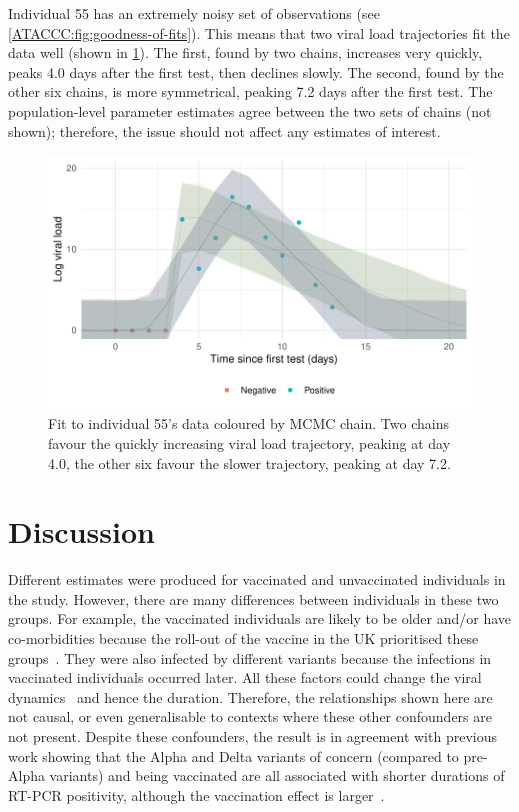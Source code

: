 \documentclass[thesis.tex]{subfiles}
\begin{document}
Individual 55 has an extremely noisy set of observations (see \cref{ATACCC:fig:goodness-of-fits}).
This means that two viral load trajectories fit the data well (shown in \cref{ATACCC:fig:individual-55}).
The first, found by two chains, increases very quickly, peaks 4.0 days after the first test, then declines slowly.
The second, found by the other six chains, is more symmetrical, peaking 7.2 days after the first test.
The population-level parameter estimates agree between the two sets of chains (not shown); therefore, the issue should not affect any estimates of interest.
\begin{figure}
  \centering \includegraphics{ATACCC/fit_individual_55}
  \caption[Goodness-of-fit for individual 55]{Fit to individual 55's data coloured by MCMC chain. Two chains favour the quickly increasing viral load trajectory, peaking at day 4.0, the other six favour the slower trajectory, peaking at day 7.2. \label{ATACCC:fig:individual-55}}
\end{figure}

\section{Discussion} \label{ATACCC:sec:discussion}

Different estimates were produced for vaccinated and unvaccinated individuals in the study.
However, there are many differences between individuals in these two groups.
For example, the vaccinated individuals are likely to be older and/or have co-morbidities because the roll-out of the vaccine in the UK prioritised these groups~\autocite{naoCovidVaccination}.
They were also infected by different variants because the infections in vaccinated individuals occurred later.
All these factors could change the viral dynamics~\autocite{russellWithinhost,kisslerDynamicsVaccines} and hence the duration.
Therefore, the relationships shown here are not causal, or even generalisable to contexts where these other confounders are not present.
Despite these confounders, the result is in agreement with previous work showing that the Alpha and Delta variants of concern (compared to pre-Alpha variants) and being vaccinated are all associated with shorter durations of RT-PCR positivity, although the vaccination effect is larger~\autocite{kisslerDynamicsVaccines}.
\end{document}
